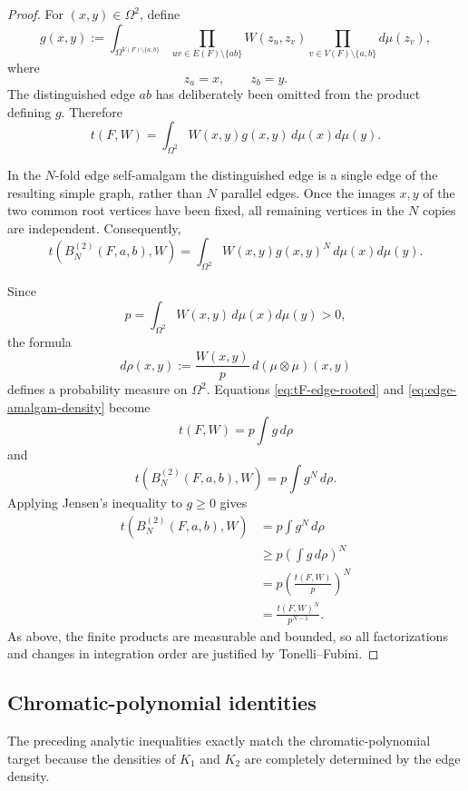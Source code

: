 \documentclass[11pt]{article}
\begin{document}
\begin{proof}
For $(x,y)\in\Omega^2$, define
\[
    g(x,y)
    :=
    \int_{\Omega^{V(F)\setminus\{a,b\}}}
       \prod_{uv\in E(F)\setminus\{ab\}}
       W(z_u,z_v)
       \prod_{v\in V(F)\setminus\{a,b\}}d\mu(z_v),
\]
where
\[
    z_a=x,
    \qquad
    z_b=y.
\]
The distinguished edge $ab$ has deliberately been omitted from the
product defining $g$. Therefore
\begin{equation}\label{eq:tF-edge-rooted}
    t(F,W)
    =
    \int_{\Omega^2}
       W(x,y)g(x,y)\,d\mu(x)d\mu(y).
\end{equation}

In the $N$-fold edge self-amalgam the distinguished edge is a single
edge of the resulting simple graph, rather than $N$ parallel edges.
Once the images $x,y$ of the two common root vertices have been fixed,
all remaining vertices in the $N$ copies are independent. Consequently,
\begin{equation}\label{eq:edge-amalgam-density}
    t(B_N^{(2)}(F,a,b),W)
    =
    \int_{\Omega^2}
       W(x,y)g(x,y)^N\,d\mu(x)d\mu(y).
\end{equation}

Since
\[
    p=\int_{\Omega^2}W(x,y)\,d\mu(x)d\mu(y)>0,
\]
the formula
\[
    d\rho(x,y)
    :=
    \frac{W(x,y)}{p}\,d(\mu\otimes\mu)(x,y)
\]
defines a probability measure on $\Omega^2$.
Equations \eqref{eq:tF-edge-rooted} and
\eqref{eq:edge-amalgam-density} become
\[
    t(F,W)
    =
    p\int g\,d\rho
\]
and
\[
    t(B_N^{(2)}(F,a,b),W)
    =
    p\int g^N\,d\rho.
\]
Applying Jensen's inequality to $g\ge0$ gives
\[
\begin{aligned}
    t(B_N^{(2)}(F,a,b),W)
    &=
    p\int g^N\,d\rho
    \\
    &\ge
    p\left(\int g\,d\rho\right)^N
    \\
    &=
    p\left(\frac{t(F,W)}{p}\right)^N
    \\
    &=
    \frac{t(F,W)^N}{p^{N-1}}.
\end{aligned}
\]
As above, the finite products are measurable and bounded, so all
factorizations and changes in integration order are justified by
Tonelli--Fubini.
\end{proof}

\subsection{Chromatic-polynomial identities}

The preceding analytic inequalities exactly match the
chromatic-polynomial target because the densities of $K_1$ and $K_2$
are completely determined by the edge density.
\end{document}
